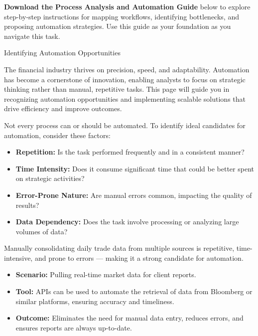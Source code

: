\documentclass[11pt]{article}
\begin{document}
\textbf{Download the Process Analysis and Automation Guide} below to explore
step-by-step instructions for mapping workflows, identifying bottlenecks, and
proposing automation strategies. Use this guide as your foundation as you
navigate this task.\par\medskip


\newpage
{\fontsize{26}{30}\selectfont Identifying Automation Opportunities}\par\bigskip

The financial industry thrives on precision, speed, and adaptability.
Automation has become a cornerstone of innovation, enabling analysts to focus
on strategic thinking rather than manual, repetitive tasks. This page will
guide you in recognizing automation opportunities and implementing scalable
solutions that drive efficiency and improve outcomes.

Not every process can or should be automated. To identify ideal candidates
for automation, consider these factors:
\begin{itemize}[leftmargin=1.5em, itemsep=2pt]
  \item \textbf{Repetition:} Is the task performed frequently and in a
  consistent manner?
  \item \textbf{Time Intensity:} Does it consume significant time that could be
  better spent on strategic activities?
  \item \textbf{Error-Prone Nature:} Are manual errors common, impacting the
  quality of results?
  \item \textbf{Data Dependency:} Does the task involve processing or analyzing
  large volumes of data?
\end{itemize}

Manually consolidating daily trade data from multiple sources is repetitive,
time-intensive, and prone to errors --- making it a strong candidate for
automation.


\begin{itemize}[leftmargin=1.5em, itemsep=2pt]
  \item \textbf{Scenario:} Pulling real-time market data for client reports.
  \item \textbf{Tool:} APIs can be used to automate the retrieval of data from
  Bloomberg or similar platforms, ensuring accuracy and timeliness.
  \item \textbf{Outcome:} Eliminates the need for manual data entry, reduces
  errors, and ensures reports are always up-to-date.
\end{itemize}
\end{document}
